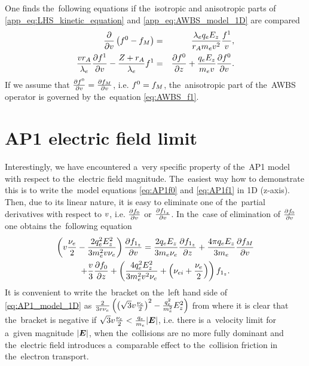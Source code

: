 One finds the~following equations if the~isotropic and anisotropic parts of 
\eqref{app_eq:LHS_kinetic_equation} and \eqref{app_eq:AWBS_model_1D} are 
compared 
\begin{eqnarray}
  \frac{\partial{}}{\partial{v}}\left( f^0 -f_M\right) &=& 
  \frac{\lambda_eq_eE_z}{r_Am_ev^2}\frac{f^1}{v} ,
  \label{app_eq:AWBS_f0} \\
  \frac{v r_A}{\lambda_e} \frac{\partial{f^1}}{\partial{v}} 
  - \frac{Z + r_A}{\lambda_e}f^1 &=&
  \frac{\partial{f^0}}{\partial{z}} + \frac{q_eE_z}{m_ev}\frac{\partial{f^0}}{\partial{v}} .
  \label{app_eq:AWBS_f1} 
\end{eqnarray}
If we assume that $\frac{\partial{f^0}}{\partial{v}} = \frac{\partial{f_M}}{\partial{v}}$, i.e. $f^0 = f_M$,
the~anisotropic part of the~AWBS operator is governed by the~equation
\eqref{eq:AWBS_f1}.

\section{AP1 electric field limit}
\label{app:AP1limit}

Interestingly, we have encountered a~very specific property of the~AP1 model
with respect to the~electric field magnitude. The~easiest way how to 
demonstrate this is to write the~model equations \eqref{eq:AP1f0} and 
\eqref{eq:AP1f1} in 1D (z-axis). Then, due to its linear nature, it is easy 
to eliminate one of the~partial derivatives with respect to $v$, i.e. 
$\frac{\partial{f_0}}{\partial{v}}$ or $\frac{\partial{f_{1_z}}}{\partial{v}}$. 
In the~case of elimination of $\frac{\partial{f_0}}{\partial{v}}$ 
one obtains the~following equation
\begin{multline}
  \left(v\frac{\nu_{e}}{2} - \frac{2q_e^2E_z^2}{3m_e^2v\nu_{e}}\right) 
  \frac{\partial{f_{1_z}}}{\partial{v}} 
  =
  \frac{2q_eE_z}{3m_e\nu_{e}}\frac{\partial{f_{1_z}}}{\partial{z}}  
  + \frac{4\pi q_eE_z}{3m_e}\frac{\partial{f_M}}{\partial{v}} \\
  + \frac{v}{3}\frac{\partial{f_0}}{\partial{z}} 
  + \left(\frac{4q_e^2E_z^2}{3m_e^2v^2\nu_{e}}
  + \left(\nu_{ei} + \frac{\nu_{e}}{2}\right) \right)f_{1_z} .
  \label{eq:AP1_model_1D}
\end{multline}
It is convenient to write the~bracket on the~left hand side of 
\eqref{eq:AP1_model_1D} as
$\frac{2}{3v\nu_{e}} 
\left(\left(\sqrt{3}v\frac{\nu_{e}}{2}\right)^2 
- \frac{q_e^2}{m_e^2}E_z^2\right)$
from where it is clear that the~bracket is negative if 
$\sqrt{3}v\frac{\nu_{e}}{2} < \frac{q_e}{m_e}|\boldsymbol{E}|$, 
i.e. there is a~velocity limit for a~given magnitude $|\boldsymbol{E}|$, 
when the~collisions are no more fully dominant and the~electric field 
introduces a~comparable effect to the~collision friction in 
the~electron transport.

